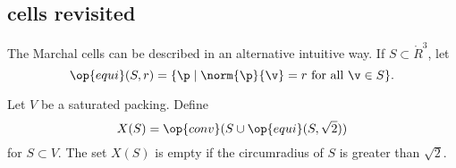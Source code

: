 %
%
%
%
%
%
%








\subsection{cells revisited}

The Marchal cells can be described in an alternative intuitive way.
If $S\subset\ring{R}^3$, let
\[
\op{equi}(S,r) = \{ \p \mid \norm{\p}{\v} = r \text{ for all } \v \in S \}.
\]


Let $V$ be a saturated packing.
Define
\[
X(S) = \op{conv} (S\cup\op{equi}(S, \sqrt2) )
\]
for $S\subset V$.  The set $X(S)$ is empty if the circumradius of $S$
is greater than $\sqrt2$.

